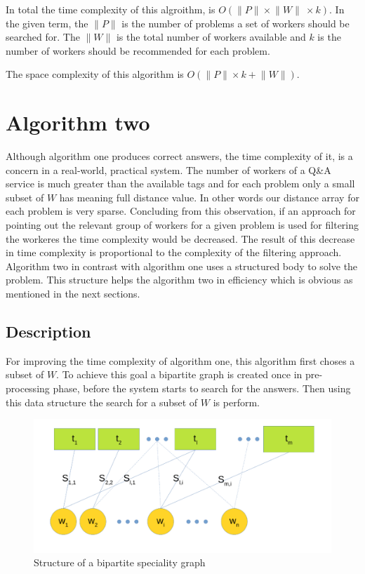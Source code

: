 \documentclass{template}
\begin{document}
In total the time complexity of this algroithm, is \(O(\lVert P \rVert \times \lVert W \rVert\ \times k) \).
In the given term, the \(\lVert P \rVert\) is the number of problems a set of workers should be searched for.
The \(\lVert W \rVert\) is the total number of workers available and \(k\) is the number of workers should be
recommended for each problem.

The space complexity of this algorithm is \(O(\lVert P \rVert \times k + \lVert W \rVert)\).

\section{Algorithm two}
\label{sec:algo-two}
Although algorithm one produces correct answers, the time complexity of it, is a concern in a real-world,
practical system. The number of workers of a Q\&A service is much greater than the available tags and for
each problem only a small subset of \(W\) has meaning full distance value. In other words our distance
array for each problem is very sparse. Concluding from this observation, if an approach for pointing out 
the relevant group of workers for a given problem is used for filtering the workeres the time complexity
would be decreased. The result of this decrease in time complexity is proportional to the complexity of 
the filtering approach.
Algorithm two in contrast with algorithm one uses a structured body to solve the problem. This structure 
helps the algorithm two in efficiency which is obvious as mentioned in the next sections.

\subsection{Description}
For improving the time complexity of algorithm one, this algorithm first choses a subset of \(W\).
To achieve this goal a bipartite graph is created once in pre-processing phase, before the system
starts to search for the answers. Then using this data structure the search for a subset of \(W\) is 
perform.

\begin{figure}
    \includegraphics[width=\linewidth]{./images/bpg.png}
    \caption{Structure of a bipartite speciality graph}
    \label{fig:bpg}
\end{figure}
\end{document}
